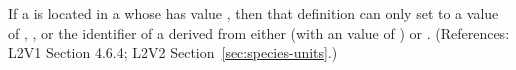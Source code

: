 If a \Species is located in a \Compartment whose 
has value , then that \Species definition can only set
 to a value of , 
, or the identifier of a \UnitDefinition derived from
either  (with an  value of ) or
.  (References: L2V1 Section 4.6.4; L2V2
Section~\ref{sec:species-units}.)
